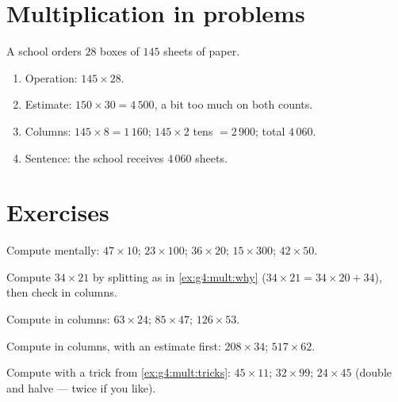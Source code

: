 \section{Multiplication in problems}

\begin{example}\label{ex:g4:mult:problem}
A school orders $28$ boxes of $145$ sheets of paper.
\begin{enumerate}
  \item Operation: $145 \times 28$.
  \item Estimate: $150 \times 30 = 4\,500$, a bit too much on both
        counts.
  \item Columns: $145 \times 8 = 1\,160$; $145 \times 2$ tens
        $= 2\,900$; total $4\,060$.
  \item Sentence: the school receives $4\,060$ sheets.
\end{enumerate}
\end{example}

\section{Exercises}

\begin{exercise}[$\star$]\label{exo:g4:mult:1}
Compute mentally: $47 \times 10$; \quad $23 \times 100$; \quad
$36 \times 20$; \quad $15 \times 300$; \quad $42 \times 50$.
\end{exercise}

\begin{exercise}[$\star$]\label{exo:g4:mult:2}
Compute $34 \times 21$ by splitting as in \cref{ex:g4:mult:why}
($34 \times 21 = 34 \times 20 + 34$), then check in columns.
\end{exercise}

\begin{exercise}[$\star$]\label{exo:g4:mult:3}
Compute in columns: $63 \times 24$; \quad $85 \times 47$; \quad
$126 \times 53$.
\end{exercise}

\begin{exercise}[$\star$]\label{exo:g4:mult:4}
Compute in columns, with an estimate first: $208 \times 34$; \quad
$517 \times 62$.
\end{exercise}

\begin{exercise}[$\star$]\label{exo:g4:mult:5}
Compute with a trick from \cref{ex:g4:mult:tricks}:
$45 \times 11$; \quad $32 \times 99$; \quad $24 \times 45$ (double
and halve --- twice if you like).
\end{exercise}

